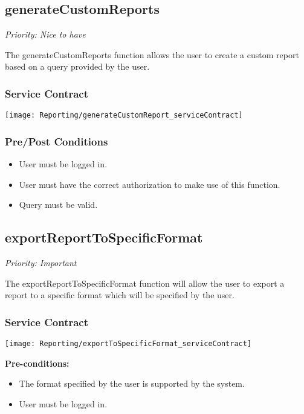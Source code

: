 \subsection{generateCustomReports}
\textit{Priority: Nice to have}

	The generateCustomReports function allows the user to create a custom report based on a query provided by the user.

\subsubsection{Service Contract}
\texttt{[image: Reporting/generateCustomReport\_serviceContract]}

\subsubsection{Pre/Post Conditions}
	\begin{itemize}
		\item User must be logged in.
		\item User must have the correct authorization to make use of this function.
		\item Query must be valid.
	\end{itemize}


\subsection{exportReportToSpecificFormat}
\textit{Priority: Important}

	The exportReportToSpecificFormat function will allow the user to export a report to a specific format which will be specified by the user.


\subsubsection{Service Contract}
\texttt{[image: Reporting/exportToSpecificFormat\_serviceContract]}

	\textbf{Pre-conditions:}
	\begin{itemize}
		\item The format specified by the user is supported by the system.
		\item User must be logged in.
	\end{itemize}
